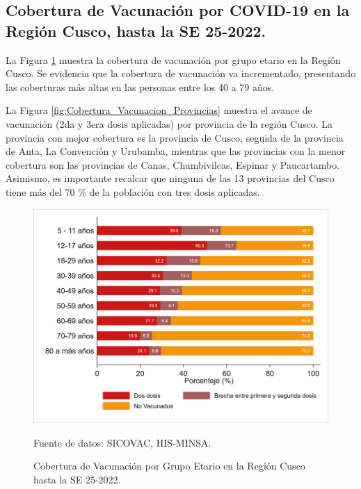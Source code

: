 \documentclass[12pt,a4paper,openany]{book}
\begin{document}
	\subsection*{Cobertura de Vacunación por COVID-19 en la Región Cusco, hasta la SE 25-2022.}
	\noindent La Figura \ref{fig:vacuna_edad} muestra la cobertura de vacunación por grupo etario en la Región Cusco. Se evidencia que la cobertura de vacunación va incrementado, presentando las coberturas más altas en las personas entre los 40 a 79 años.
	
	La Figura \ref{fig:Cobertura_Vacunacion_Provincias} muestra el avance de vacunación (2da y 3era dosis aplicadas) por provincia de la región Cusco. La provincia con mejor cobertura es la provincia de Cusco, seguida de la provincia de Anta, La Convención y Urubamba, mientras que las provincias con la menor cobertura son las provincias de Canas, Chumbivilcas, Espinar y Paucartambo. Asimismo, es importante recalcar que ninguna de las 13 provincias del Cusco tiene más del 70 $\%$ de la población con tres dosis aplicadas. 
	\begin{figure}[h]
		\caption{Cobertura de Vacunación por Grupo Etario en la Región Cusco hasta la SE 25-2022. }\label{fig:vacuna_edad}
		\begin{center}
			\includegraphics[width=0.85\linewidth]{../figuras/vacunacion_grupo_edad.png}
		\end{center}
		{\footnotesize {Fuente de datos: SICOVAC, HIS-MINSA.}}
	\end{figure}
	\clearpage
	
\end{document}
